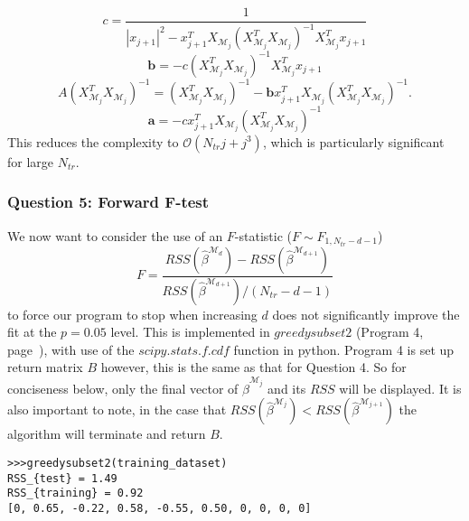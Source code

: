 \documentclass{article}
\begin{document}
\begin{equation*}
c= \frac{1}{|x_{j+1}|^2 -x_{j+1}^T X_{\mathcal{M}_{j}} (X_{\mathcal{M}_{j}}^T X_{\mathcal{M}_{j}} )^{-1} X_{\mathcal{M}_{j}}^T x_{j+1}}
\end{equation*}
\begin{equation*}
\mathbf{b} = -c (X_{\mathcal{M}_{j}}^T X_{\mathcal{M}_{j}})^{-1} X_{\mathcal{M}_{j}}^T x_{j+1}
\end{equation*}
\begin{equation*}
A(X_{\mathcal{M}_{j}}^T X_{\mathcal{M}_{j}} )^{-1} = (X_{\mathcal{M}_{j}}^T X_{\mathcal{M}_{j}})^{-1} - \mathbf{b}x_{j+1}^T X_{\mathcal{M}_{j}} (X_{\mathcal{M}_{j}}^T X_{\mathcal{M}_{j}})^{-1}.
\end{equation*}
\begin{equation*}
\mathbf{a} = -c x_{j+1}^T X_{\mathcal{M}_j} (X_{\mathcal{M}_{j}}^T X_{\mathcal{M}_{j}})^{-1}
\end{equation*}
This reduces the complexity to $\mathcal{O}(N_{tr} j + j^3)$, which is particularly significant for large $N_{tr}$.

\vspace{-0.5cm}
\subsubsection{Question 5: Forward F-test}
\vspace{-0.3cm}

We now want to consider the use of an $F$-statistic ($F \sim F_{1,N_{tr}-d-1}$)
\begin{equation*}
F=\frac{RSS(\hat{\beta}^{\mathcal{M}_d})-RSS(\hat{\beta}^{\mathcal{M}_{d+1}})}{RSS(\hat{\beta}^{\mathcal{M}_{d+1}}) / (N_{tr}-d-1)}
\end{equation*}
to force our program to stop when increasing $d$ does not significantly improve the fit at the $p=0.05$ level. This is implemented in $\textit{greedysubset2}$ (Program 4, page~\pageref{subsec:Program 4}), with use of the $\textit{scipy.stats.f.cdf}$ function in python. Program 4 is set up return matrix $B$ however, this is the same as that for Question 4. So for conciseness below, only the final vector of $\hat{\beta}^{\mathcal{M}_j}$ and its $RSS$ will be displayed. It is also important to note, in the case that $RSS(\hat{\beta}^{\mathcal{M}_j}) < RSS (\hat{\beta}^{\mathcal{M}_{j+1}})$ the algorithm will terminate and return $B$.

\begin{lstlisting}
>>>greedysubset2(training_dataset)
RSS_{test} = 1.49
RSS_{training} = 0.92
[0, 0.65, -0.22, 0.58, -0.55, 0.50, 0, 0, 0, 0]
\end{lstlisting}
\end{document}
